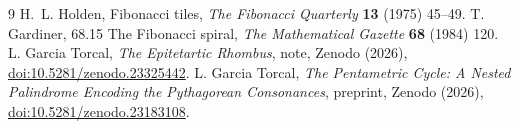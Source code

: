 \documentclass[11pt,a4paper]{article}
\theoremstyle{plain}
\theoremstyle{definition}
\theoremstyle{remark}
\begin{document}
{\footnotesize\begin{thebibliography}{9}\setlength{\itemsep}{0pt}
 H.~L. Holden, Fibonacci tiles, \emph{The Fibonacci Quarterly} \textbf{13} (1975) 45--49.
 T. Gardiner, 68.15 The Fibonacci spiral, \emph{The Mathematical Gazette} \textbf{68} (1984) 120.
 L. Garcia Torcal, \emph{The Epitetartic Rhombus}, note, Zenodo (2026), \href{https://doi.org/10.5281/zenodo.23325442}{doi:10.5281/zenodo.23325442}.
 L. Garcia Torcal, \emph{The Pentametric Cycle: A Nested Palindrome Encoding the Pythagorean Consonances}, preprint, Zenodo (2026), \href{https://doi.org/10.5281/zenodo.23183108}{doi:10.5281/zenodo.23183108}.
\end{thebibliography}}
\end{document}
